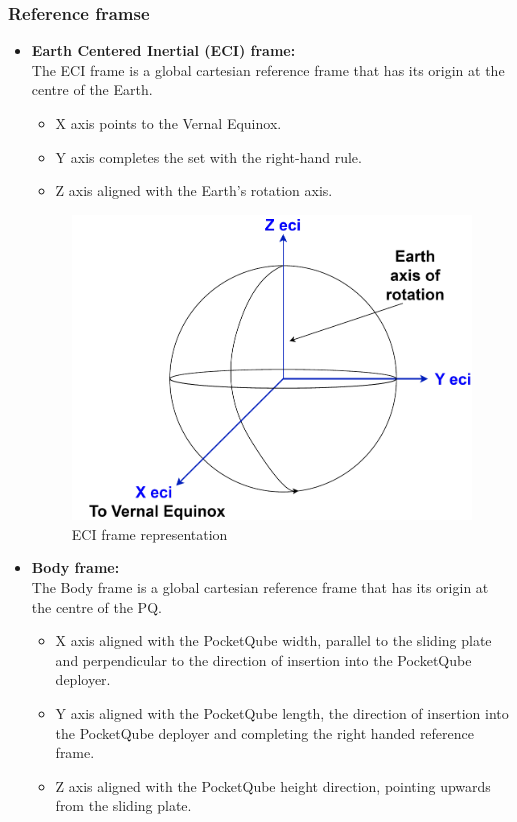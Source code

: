 \subsubsection{Reference framse}
\begin{itemize}
    \item \textbf{Earth Centered Inertial (ECI) frame:}\\
    The ECI frame is a global cartesian reference frame that has its origin at the centre of the
    Earth.
    \begin{itemize}
        \item X axis points to the Vernal Equinox.
        \item Y axis completes the set with the right-hand rule.
        \item Z axis aligned with the Earth's rotation axis.
    \end{itemize}

    \begin{figure}[H]
        \centering
        \includegraphics[width=0.4\linewidth]{res/img/3_simulation_performance/ECI frame.drawio.pdf}
        \caption{ECI frame representation}
        \label{fig:ECIframe}
    \end{figure}

    \item \textbf{Body frame:}\\
    The Body frame is a global cartesian reference frame that has its origin at the centre of
    the PQ.
    \begin{itemize}
        \item X axis aligned with the PocketQube width, parallel to the sliding plate and perpendicular
        to the direction of insertion into the PocketQube deployer.
        \item Y axis aligned with the PocketQube length, the direction of insertion into the
        PocketQube deployer and completing the right handed reference frame.
        \item Z axis aligned with the PocketQube height direction, pointing upwards from the
        sliding plate.


\end{itemize}
\end{itemize}
